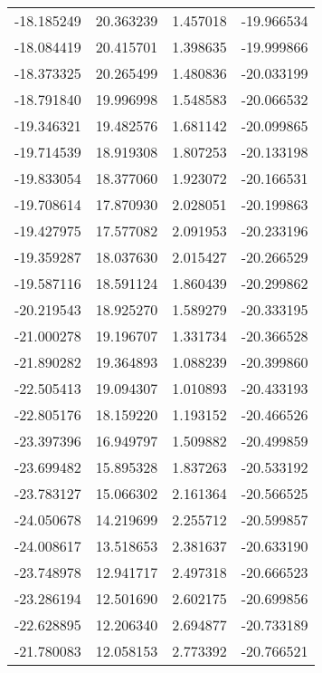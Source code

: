 \begin{tabular}{rrrr}
      -18.185249 &        20.363239 &    1.457018 & -19.966534 \\
      -18.084419 &        20.415701 &    1.398635 & -19.999866 \\
      -18.373325 &        20.265499 &    1.480836 & -20.033199 \\
      -18.791840 &        19.996998 &    1.548583 & -20.066532 \\
      -19.346321 &        19.482576 &    1.681142 & -20.099865 \\
      -19.714539 &        18.919308 &    1.807253 & -20.133198 \\
      -19.833054 &        18.377060 &    1.923072 & -20.166531 \\
      -19.708614 &        17.870930 &    2.028051 & -20.199863 \\
      -19.427975 &        17.577082 &    2.091953 & -20.233196 \\
      -19.359287 &        18.037630 &    2.015427 & -20.266529 \\
      -19.587116 &        18.591124 &    1.860439 & -20.299862 \\
      -20.219543 &        18.925270 &    1.589279 & -20.333195 \\
      -21.000278 &        19.196707 &    1.331734 & -20.366528 \\
      -21.890282 &        19.364893 &    1.088239 & -20.399860 \\
      -22.505413 &        19.094307 &    1.010893 & -20.433193 \\
      -22.805176 &        18.159220 &    1.193152 & -20.466526 \\
      -23.397396 &        16.949797 &    1.509882 & -20.499859 \\
      -23.699482 &        15.895328 &    1.837263 & -20.533192 \\
      -23.783127 &        15.066302 &    2.161364 & -20.566525 \\
      -24.050678 &        14.219699 &    2.255712 & -20.599857 \\
      -24.008617 &        13.518653 &    2.381637 & -20.633190 \\
      -23.748978 &        12.941717 &    2.497318 & -20.666523 \\
      -23.286194 &        12.501690 &    2.602175 & -20.699856 \\
      -22.628895 &        12.206340 &    2.694877 & -20.733189 \\
      -21.780083 &        12.058153 &    2.773392 & -20.766521 \\

\end{tabular}
